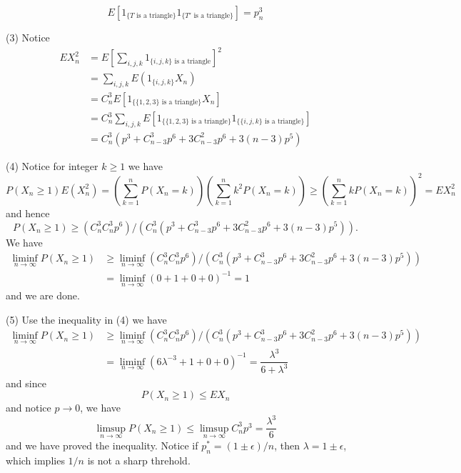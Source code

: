 \documentclass[lang=en,11pt,a4paper,citestyle =authoryear]{elegantpaper}
\begin{document}
\[
E[1_{\{T\text{ is a triangle}\}}1_{\{T'\text{ is a triangle}\}}] = p_n^3
\]\par
(3) Notice
\[
\begin{aligned}
EX_n^2 &= E\left[\sum\limits_{i,j,k} 1_{\{i,j,k\}\text{ is a triangle}}\right]^2 \\
&=  \sum\limits_{i,j,k} E(1_{\{i,j,k\}}X_n) \\
&= C_n^3E[1_{\{\{1,2,3\}\text{ is a triangle}\}}X_n] \\
&= C_n^3 \sum\limits_{i,j,k} E[1_{\{\{1,2,3\}\text{ is a triangle}\}}1_{\{\{i,j,k\}\text{ is a triangle}\}}] \\
&= C_n^3 (p^3 + C_{n-3}^3 p^6 + 3C_{n-3}^2 p^6 + 3(n-3)p^5)
\end{aligned}
\]\par
(4) Notice for integer $k\geq 1$ we have
\[
P(X_n\geq 1)E(X_n^2) = \left(\sum\limits_{k=1}^n P(X_n = k)\right)\left(\sum\limits_{k=1}^n k^2P(X_n = k)\right) \geq \left(\sum\limits_{k=1}^n kP(X_n = k)\right)^2 = EX_n^2
\]
and hence
\[
P(X_n\geq 1) \geq (C_n^3C_n^3 p^6)/\left(C_n^3 (p^3 + C_{n-3}^3 p^6 + 3C_{n-3}^2 p^6 + 3(n-3)p^5)\right).
\]
We have
\[
\begin{aligned}
\liminf_{n\to\infty} P(X_n\geq 1) &\geq \liminf_{n\to\infty}(C_n^3C_n^3 p^6)/\left(C_n^3 (p^3 + C_{n-3}^3 p^6 + 3C_{n-3}^2 p^6 + 3(n-3)p^5)\right)\\
&= \liminf_{n\to\infty} (0+1+0+0)^{-1} = 1
\end{aligned}
\]
and we are done.\par
(5) Use the inequality in (4) we have
\[
\begin{aligned}
\liminf_{n\to\infty} P(X_n\geq 1) &\geq \liminf_{n\to\infty}(C_n^3C_n^3 p^6)/\left(C_n^3 (p^3 + C_{n-3}^3 p^6 + 3C_{n-3}^2 p^6 + 3(n-3)p^5)\right)\\
&= \liminf_{n\to\infty} (6\lambda^{-3} + 1 + 0 + 0)^{-1} = \dfrac{\lambda^3}{6+\lambda^3}
\end{aligned}
\]
and since 
\[
P(X_n \geq 1) \leq EX_n
\]
and notice $p\to 0$, we have
\[
\limsup_{n\to\infty}P(X_n \geq 1) \leq \limsup_{n\to\infty}C_n^3 p^3 = \dfrac{\lambda^3}{6}
\]
and we have proved the inequality. Notice if $p_n^* = (1\pm\epsilon)/n$, then $\lambda = 1\pm \epsilon$, which implies $1/n$ is not a sharp threhold.
\par 
\vspace{0.5em}
\end{document}
